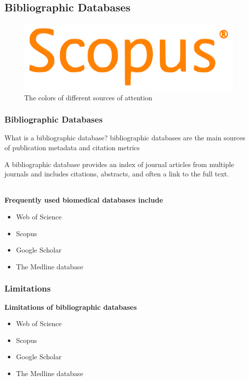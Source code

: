 \documentclass{beamer}
\begin{document}
\subsection{Bibliographic Databases}
\begin{frame}
    \begin{figure}[h]
        \includegraphics[height=0.41\textheight]{s.png}
        \caption{The colors of different sources of attention}
    \end{figure}
\end{frame}
\begin{frame}

    \frametitle{Bibliographic Databases}

    \begin{block}{What is a bibliographic database?}
        bibliographic databases are the main sources of publication metadata and citation metrics
    \end{block}

    A bibliographic database provides an index of journal articles from multiple journals and includes citations, abstracts, and often a link to the full text.\\~\

     \textbf{Frequently used biomedical databases include}
    \begin{itemize}
   \item Web of Science
   \item Scopus 
   \item  Google Scholar 
   \item  The Medline database
   \end{itemize}
\end{frame}
\begin{frame}

    \frametitle{Limitations }
    \textbf{Limitations of bibliographic databases}
    \begin{itemize}
   \item Web of Science
   \item Scopus 
   \item  Google Scholar 
   \item  The Medline database
   \end{itemize}
\end{frame}
\end{document}
